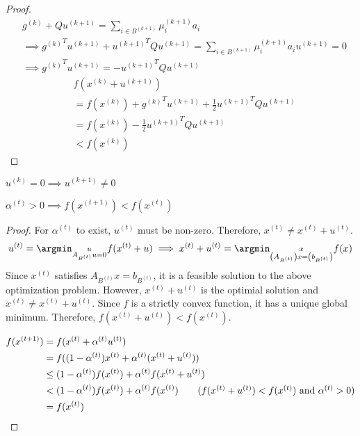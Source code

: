 \begin{proof}
\begin{align*}
& g^{(k)} + Qu^{(k+1)} = \sum_{i \in B^{(k+1)}} \mu_i^{(k+1)}a_i
\\ &\implies {g^{(k)}}^Tu^{(k+1)} + {u^{(k+1)}}^TQu^{(k+1)} = \sum_{i \in B^{(k+1)}} \mu_i^{(k+1)}a_iu^{(k+1)} = 0
\\ &\implies {g^{(k)}}^Tu^{(k+1)} = - {u^{(k+1)}}^TQu^{(k+1)}
\end{align*}
\begin{align*}
& f(x^{(k)} + u^{(k+1)})
\\ &= f(x^{(k)}) + {g^{(k)}}^Tu^{(k+1)} + \frac{1}{2}{u^{(k+1)}}^TQu^{(k+1)} \tag{Taylor series}
\\ &= f(x^{(k)}) - \frac{1}{2}{u^{(k+1)}}^TQu^{(k+1)}
\\ &< f(x^{(k)}) \tag{$Q$ is PD}
\end{align*}
\end{proof}

\begin{corollary}
$u^{(k)} = 0 \implies u^{(k+1)} \neq 0$
\end{corollary}

\begin{lemma}
$\alpha^{(t)} > 0 \implies f(x^{(t+1)}) < f(x^{(t)})$
\end{lemma}
\begin{proof}
For $\alpha^{(t)}$ to exist, $u^{(t)}$ must be non-zero.
Therefore, $x^{(t)} \neq x^{(t)} + u^{(t)}$.
\[ u^{(t)} = \argmin_{\substack{u \\ A_{B^{(t)}}u = 0}} f(x^{(t)} + u)
\\ \implies x^{(t)} + u^{(t)} = \argmin_{\substack{x \\ \left(A_{B^{(t)}}\right)x = \left(b_{B^{(t)}}\right)}} f(x) \]
Since $x^{(t)}$ satisfies $A_{B^{(t)}}x = b_{B^{(t)}}$,
it is a feasible solution to the above optimization problem.
However, $x^{(t)} + u^{(t)}$ is the optimial solution and $x^{(t)} \neq x^{(t)} + u^{(t)}$.
Since $f$ is a strictly convex function, it has a unique global minimum.
Therefore, $f(x^{(t)} + u^{(t)}) < f(x^{(t)})$.

\begin{align*}
f(x^{(t+1)}) &= f(x^{(t)} + \alpha^{(t)}u^{(t)})
\\ &= f((1-\alpha^{(t)})x^{(t)} + \alpha^{(t)}(x^{(t)} + u^{(t)}))
\\ &\le (1-\alpha^{(t)})f(x^{(t)}) + \alpha^{(t)}f(x^{(t)} + u^{(t)})
\\ &< (1-\alpha^{(t)})f(x^{(t)}) + \alpha^{(t)}f(x^{(t)})
\tag{$f(x^{(t)} + u^{(t)}) < f(x^{(t)})$ and $\alpha^{(t)} > 0$}
\\ &= f(x^{(t)})
\end{align*}
\end{proof}


